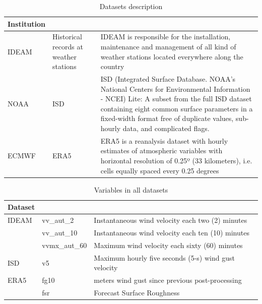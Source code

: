 \documentclass[12pt,twoside]{reedthesis}
\begin{document}
\begingroup\fontsize{10}{12}\selectfont
\begin{longtable}[t]{l>{\raggedright\arraybackslash}p{1.2in}>{\raggedright\arraybackslash}p{3.8in}}
\caption[Datasets Description]{\label{tab:tabledatasources1}Datasets description}\\
\toprule
\multicolumn{1}{l}{Institution} & \multicolumn{1}{l}{Dataset} & \multicolumn{1}{l}{Details}\\
\midrule
IDEAM & Historical records at weather stations & IDEAM is responsible for the installation, maintenance and management of all kind of weather stations located everywhere along the country\\
NOAA & ISD & ISD (Integrated Surface Database. NOAA's National Centers for Environmental Information - NCEI) Lite: A subset from the full ISD dataset containing eight common surface parameters in a fixed-width format free of duplicate values, sub-hourly data, and complicated flags.\\
ECMWF & ERA5 & ERA5 is a reanalysis dataset with hourly estimates of atmospheric variables with horizontal resolution of 0.25º (33 kilometers), i.e. cells equally spaced every 0.25 degrees\\
\bottomrule
\end{longtable}
\endgroup{}

\begingroup\fontsize{10}{12}\selectfont
\begin{longtable}[t]{l>{\raggedright\arraybackslash}p{1.2in}>{\raggedright\arraybackslash}p{3.5in}}
\caption[Datasets Variables]{\label{tab:tabledatasources2}Variables in all datasets}\\
\toprule
\multicolumn{1}{l}{Dataset} & \multicolumn{1}{l}{Variables} & \multicolumn{1}{l}{Description}\\
\midrule
IDEAM & vv\_aut\_2 & Instantaneous wind velocity each two (2) minutes\\
 & vv\_aut\_10 & Instantaneous wind velocity each ten (10) minutes\\
 & vvmx\_aut\_60 & Maximum wind velocity each sixty (60) minutes\\
ISD & v5 & Maximum hourly five seconds (5-s) wind gust velocity\\
ERA5 & fg10 & 10 meters wind gust since previous post-processing\\
\addlinespace
 & fsr & Forecast Surface Roughness\\
\bottomrule
\end{longtable}
\endgroup{}
\end{document}
